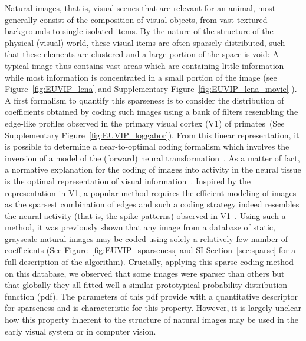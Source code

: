 \documentclass[a4paper, 10pt, twocolumns]{article}
\begin{document}
Natural images, that is, visual scenes that are relevant for an animal, most generally consist of the composition of visual objects, from vast textured backgrounds to single isolated items. By the nature of the structure of the physical (visual) world, these visual items are often sparsely distributed, such that these elements are clustered and a large portion of the space is void: A typical image thus contains vast areas which are containing little information while most information is concentrated in a small portion of the image (see Figure~\ref{fig:EUVIP_lena}\if{} and Supplementary Figure~\ref{fig:EUVIP_lena_movie} \fi). A first formalism to quantify this sparseness is to consider the distribution of coefficients obtained by coding such images using a bank of filters resembling the edge-like profiles observed in the primary visual cortex (V1) of primates\if{}~(See Supplementary Figure~\ref{fig:EUVIP_loggabor})\fi. From this linear representation, it is possible to determine a near-to-optimal coding formalism which involves the inversion of a model of the (forward) neural transformation~\citep{Simoncelli2004}.  As a matter of fact, a normative explanation for the coding of images into activity in the neural tissue is the optimal representation of visual information~\citep{Atick92}. Inspired by the representation in V1, a popular method requires the efficient modeling of images as the sparsest combination of edges and such a coding strategy indeed resembles the neural activity (that is, the spike patterns) observed in V1~\citep{Perrinet15bicv}. Using such a method, it was previously shown that any image from a database of static, grayscale natural images may be coded using solely a relatively few number of coefficients (See Figure~\ref{fig:EUVIP_sparseness}\if{} and SI Section~\ref{sec:sparse} for a full description of the algorithm\fi). Crucially, applying this sparse coding method on this database, we observed that some images were sparser than others but that globally they all fitted well a similar prototypical probability distribution function (pdf). The parameters of this pdf provide with a quantitative descriptor for sparseness and is characteristic for this property. However, it is largely unclear how this property inherent to the structure of natural images may be used in the early visual system or in computer vision. %
\end{document}

